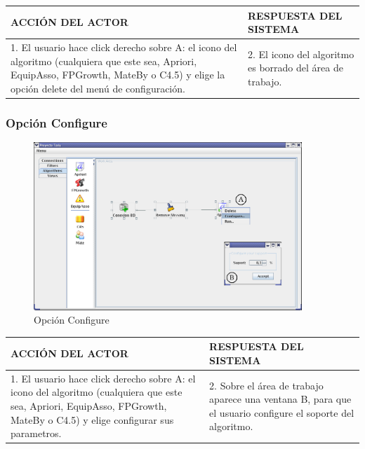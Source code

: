 \begin{center}
\begin{tabular}{|p{60mm}|p{60mm}|}\hline
ACCI\'ON DEL ACTOR & RESPUESTA DEL SISTEMA \\ \hline
1. El usuario hace click derecho sobre A: el icono del algoritmo (cualquiera que este sea, Apriori, EquipAsso,
FPGrowth, MateBy o C4.5) y elige la opci\'on delete del men\'u de configuraci\'on.
& 2. El icono del algoritmo es borrado del \'area de trabajo. \\ \hline
\end{tabular}
\end{center}
\newpage

\subsubsection{Opci\'on Configure}
\begin{figure}[h]
 \centering
 \includegraphics[width=0.9\textwidth]{images/am2.png}
 \caption{Opci\'on Configure}
\end{figure}

\begin{center}
\begin{tabular}{|p{60mm}|p{60mm}|}\hline
ACCI\'ON DEL ACTOR & RESPUESTA DEL SISTEMA \\ \hline
1. El usuario hace click derecho sobre A: el icono del algoritmo (cualquiera que este sea, Apriori, EquipAsso,
FPGrowth, MateBy o C4.5) y elige configurar sus parametros.
& 2. Sobre el \'area de trabajo aparece una ventana B, para que el usuario configure el soporte del algoritmo. \\
\hline
\end{tabular}
\end{center}
\newpage

